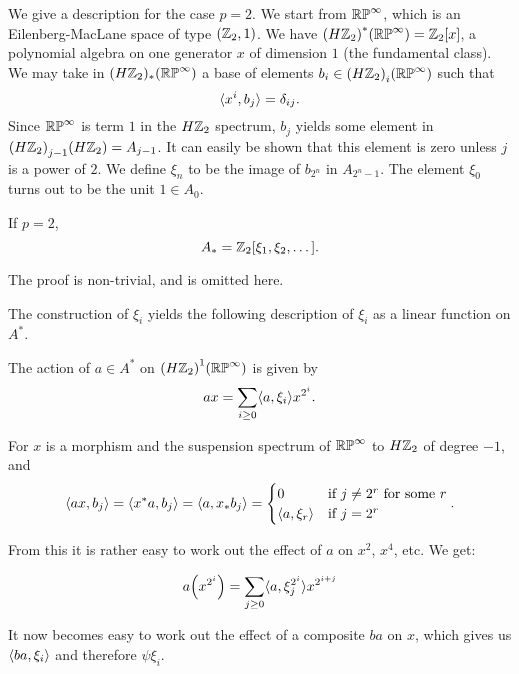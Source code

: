 \documentclass[../main]{subfiles}
\begin{document}
We give a description for the case $p=2$. We start from $\mathbb{RP}^\infty$, which is an Eilenberg-MacLane space of type $(\mathbb{Z}_2,1)$. We have ${(H\mathbb{Z}_2)}^\ast(\mathbb{RP}^\infty)=\mathbb{Z}_2[x]$, a polynomial algebra on one generator $x$ of dimension $1$ (the fundamental class). We may take in $(H\mathbb{Z}_2)_\ast(\mathbb{RP}^\infty)$ a base of elements $b_i\in{(H\mathbb{Z}_2)}_i(\mathbb{RP}^\infty)$ such that
\[ \langle x^i, b_j\rangle = \delta_{ij} . \]
Since $\mathbb{RP}^\infty$ is term $1$ in the $H\mathbb{Z}_2$ spectrum, $b_j$ yields some element in \newline ${(H\mathbb{Z}_2)}_{j-1}(H\mathbb{Z}_2)=A_{j-1}$. It can easily be shown that this element is zero unless $j$ is a power of $2$. We define $\xi_n$ to be the image of $b_{2^n}$ in $A_{2^n-1}$. The element $\xi_0$ turns out to be the unit $1\in A_0$.

\begin{theorem} \label{thm:p3ch12.1}
If $p=2$,
\[ A_\ast=\mathbb{Z}_2[\xi_1,\xi_2,\dots] . \]
\end{theorem}

The proof is non-trivial, and is omitted here.

The construction of $\xi_i$ yields the following description of $\xi_i$ as a linear function on $A^\ast$.

\begin{proposition} \label{prop:p3ch12.2}
The action of $a\in A^\ast$ on ${(H\mathbb{Z}_2)}^1(\mathbb{RP}^\infty)$ is given by
\[ ax = \sum_{i\geq0}\langle a,\xi_i\rangle x^{2^i} . \]

\end{proposition}

For $x$ is a morphism and the suspension spectrum of $\mathbb{RP}^\infty$ to $H\mathbb{Z}_2$ of degree $-1$, and
\[ \langle ax,b_j\rangle = \langle x^\ast a,b_j\rangle = \langle a,x_\ast b_j\rangle = \begin{cases} 0 & \text{if $j\neq 2^r$ for some $r$} \\ \langle a,\xi_r\rangle & \text{if } j=2^r \end{cases} . \]

From this it is rather easy to work out the effect of $a$ on $x^2$, $x^4$, etc. We get:

\begin{proposition} \label{prop:p3ch12.3}
\[ a\Big(x^{2^i}\Big) = \sum_{j\geq0}\langle a,\xi_j^{2^i}\rangle x^{2^{i+j}} \]
\end{proposition}

It now becomes easy to work out the effect of a composite $ba$ on $x$, which gives us $\langle ba,\xi_i\rangle$ and therefore $\psi\xi_i$.
\end{document}
